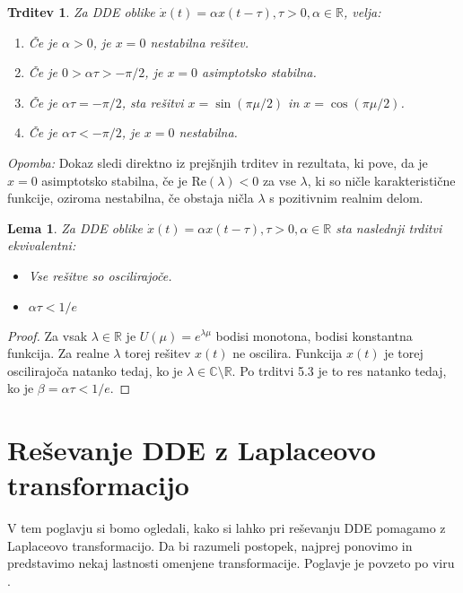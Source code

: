 \documentclass[12pt,a4paper]{amsart}
\theoremstyle{definition} %
\theoremstyle{plain} %
\newtheorem{lema}[definicija]{Lema}
\newtheorem{trditev}[definicija]{Trditev}
\newcommand{\R}{\mathbb R}
\begin{document}
\begin{trditev}
    Za DDE oblike $\dot{x}(t)= \alpha x(t-\tau), \tau >0, \alpha \in \R$, velja:
    \begin{enumerate}
        \item Če je $\alpha > 0$, je $x=0$ nestabilna rešitev.
        \item Če je $0>\alpha \tau >-\pi/2$, je $x=0$ asimptotsko stabilna.
        \item Če je $\alpha \tau = -\pi/2$, sta rešitvi $x=\sin(\pi\mu/2)$ in $x=\cos(\pi\mu/2)$.
        \item Če je $\alpha\tau < -\pi/2$, je $x=0$ nestabilna.
    \end{enumerate}
\end{trditev}

\noindent \textit{Opomba: }Dokaz sledi direktno iz prejšnjih trditev in rezultata, ki pove, da je $x=0$ asimptotsko stabilna, če 
je $\text{Re}(\lambda) < 0$ za vse $\lambda$, ki so ničle karakteristične funkcije, oziroma nestabilna,
če obstaja ničla $\lambda$ s pozitivnim realnim delom.

\begin{lema}
    Za DDE oblike $\dot{x}(t)= \alpha x(t-\tau), \tau >0, \alpha \in \R$ sta naslednji trditvi
    ekvivalentni:
    \begin{itemize}
        \item Vse rešitve so oscilirajoče.
        \item $\alpha\tau < 1/e$
    \end{itemize}
\end{lema}

\begin{proof}
    Za vsak $\lambda \in \R$ je $U(\mu)=e^{\lambda\mu}$ bodisi monotona, bodisi konstantna funkcija.
    Za realne $\lambda$ torej rešitev $x(t)$ ne oscilira. Funkcija $x(t)$ je torej oscilirajoča natanko tedaj, ko
    je $\lambda\in\mathbb{C}\setminus\mathbb{R}$. Po trditvi 5.3 je to res natanko tedaj, ko je 
    $\beta = \alpha\tau < 1/e$.
\end{proof}

\section{Reševanje DDE z Laplaceovo transformacijo}



V tem poglavju si bomo ogledali, kako si lahko pri reševanju DDE pomagamo z Laplaceovo transformacijo.
Da bi razumeli postopek, najprej ponovimo in predstavimo nekaj lastnosti omenjene transformacije. Poglavje je 
povzeto po viru \cite{knjiga}.
\end{document}
